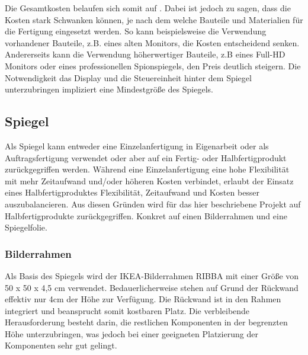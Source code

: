 Die Gesamtkosten belaufen sich somit auf . Dabei ist jedoch zu sagen, dass die Kosten stark Schwanken können, je nach dem welche Bauteile und Materialien für die Fertigung eingesetzt werden. So kann beispielsweise die Verwendung vorhandener Bauteile, z.B. eines alten Monitors, die Kosten entscheidend senken. Andererseits kann die Verwendung höherwertiger Bauteile, z.B eines Full-HD Monitors oder eines professionellen Spionspiegels, den Preis deutlich steigern. Die Notwendigkeit das Display und die Steuereinheit hinter dem Spiegel unterzubringen impliziert eine Mindestgröße des Spiegels.

\subsection{Spiegel}
Als Spiegel kann entweder eine Einzelanfertigung in Eigenarbeit oder als Auftragsfertigung verwendet oder aber auf ein Fertig- oder Halbfertigprodukt zurückgegriffen werden. Während eine Einzelanfertigung eine hohe Flexibilität mit mehr Zeitaufwand und/oder höheren Kosten verbindet, erlaubt der Einsatz eines Halbfertigproduktes Flexibilität, Zeitaufwand und Kosten besser auszubalancieren. Aus diesen Gründen wird für das hier beschriebene Projekt auf Halbfertigprodukte zurückgegriffen. Konkret auf einen Bilderrahmen und eine Spiegelfolie.

\subsubsection*{Bilderrahmen}
Als Basis des Spiegels wird der IKEA-Bilderrahmen RIBBA mit einer Größe von 50 x 50 x 4,5 cm verwendet. Bedauerlicherweise stehen auf Grund der Rückwand effektiv nur 4cm der Höhe zur Verfügung. Die Rückwand ist in den Rahmen integriert und beansprucht somit kostbaren Platz. Die verbleibende Herausforderung besteht darin, die restlichen Komponenten in der begrenzten Höhe unterzubringen, was jedoch bei einer geeigneten Platzierung der Komponenten sehr gut gelingt. 

